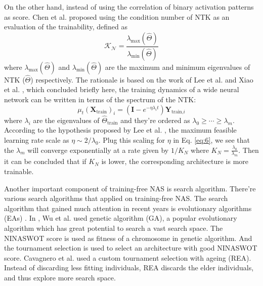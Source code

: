 \documentclass[sigconf]{acmart}
\begin{document}
    On the other hand, instead of using the correlation of binary activation 
    patterns as score. Chen et al. proposed using the condition number of NTK 
    as an evaluation of the trainability, defined as %
    \begin{equation}
        \mathcal{K_N}=\frac{\lambda_{\textrm{max}}(\hat\Theta)}{\lambda_{\textrm{min}}(\hat\Theta)}
    \end{equation}
    where $\lambda_{\textrm{max}}(\hat\Theta)$ and $\lambda_{\textrm{min}}(\hat\Theta)$ 
    are the maximum and minimum eigenvalues of NTK ($\hat\Theta$) respectively.
    The rationale is based on the work of Lee et al. \cite{Lee_2020} and 
    Xiao et al. \cite{https://doi.org/10.48550/arxiv.1912.13053}, which concluded briefly here, 
    the training dynamics of a wide neural network can be written in terms of the 
    spectrum of the NTK:
    \begin{equation}\label{eq:6}
        \mu_t(\textbf{X}_{\textrm{train}})_i=(\textbf{I}-e^{-\eta\lambda_it})\textbf{Y}_{\textrm{train,}i}
    \end{equation}
    where $\lambda_i$ are the eigenvalues of $\hat\Theta_{\textrm{train}}$ 
    and they're ordered as $\lambda_0\geq\cdots\geq\lambda_m$. 
    According to the hypothesis proposed by Lee et al. \cite{Lee_2020}, the maximum 
    feasible learning rate scale as $\eta\sim2/\lambda_0$. Plug this scaling for 
    $\eta$ in Eq. \ref{eq:6}, we see that the $\lambda_m$ will converge exponentially 
    at a rate given by $1/K_N$ where $K_N=\frac{\lambda_0}{\lambda_m}$.
    Then it can be concluded that if $K_N$ is lower, the corresponding architecture is 
    more trainable.

    Another important component of training-free NAS is search algorithm. There're 
    various search algorithms that applied on training-free NAS. The search algorithm 
    that gained much attention in recent years is evolutionary algorithms (EAs) \cite{Liu_2023}.
    In \cite{10.1145/3491396.3506510}, Wu et al. used genetic algorithm (GA), a popular 
    evolutionary algorithm which has great potential to search a vast search space. 
    The NINASWOT score is used as fitness of a chromosome in genetic algorithm. And 
    the tournament selection is used to select an architecture with good NINASWOT score.
    Cavagnero et al. \cite{https://doi.org/10.48550/arxiv.2207.05135} used a custom 
	tournament selection with ageing (REA). Instead of discarding less fitting 
	individuals, REA discards the elder individuals, and thus explore more search 
	space. 
	
\end{document}
